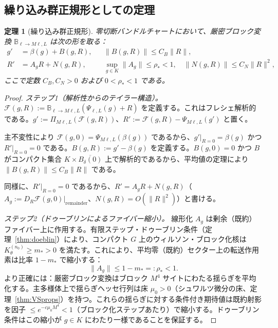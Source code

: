 \documentclass[12pt]{article}
\theoremstyle{plain}
\newtheorem{theorem}{定理}[section]
\theoremstyle{definition}
\numberwithin{equation}{section}
\begin{document}
\subsection{繰り込み群正規形としての定理}

\begin{theorem}[繰り込み群正規形]\label{thm:normalform}
零切断バンドルチャートにおいて、厳密ブロック変換 $\mathbb{B}_{\ell\to M\ell,L}$ は次の形を取る：
\begin{align}
g' &= \beta(g)+B(g,R), && \|B(g,R)\|\leq C_B\|R\|,\\
R' &= A_g R+N(g,R), && \sup_{g\in K}\|A_g\|\leq\rho_*<1,\quad \|N(g,R)\|\leq C_N\|R\|^2,
\end{align}
ここで定数 $C_B,C_N>0$ および $0<\rho_*<1$ である。
\end{theorem}

\begin{proof}
\emph{ステップ1（解析性からのテイラー構造）。}
$\mathcal{F}(g,R):=\mathbb{B}_{\ell\to M\ell,L}(\Psi_{\ell,L}(g)+R)$ を定義する。これはフレシェ解析的である。$g':=\Pi_{M\ell,L}(\mathcal{F}(g,R))$、$R':=\mathcal{F}(g,R)-\Psi_{M\ell,L}(g')$ と置く。

主不変性により $\mathcal{F}(g,0)=\Psi_{M\ell,L}(\beta(g))$ であるから、$g'|_{R=0}=\beta(g)$ かつ $R'|_{R=0}=0$ である。$B(g,R):=g'-\beta(g)$ を定義する。$B(g,0)=0$ かつ $B$ がコンパクト集合 $K\times\overline{B_\delta(0)}$ 上で解析的であるから、平均値の定理により $\|B(g,R)\|\leq C_B\|R\|$ である。

同様に、$R'|_{R=0}=0$ であるから、$R'=A_g R+N(g,R)$（$A_g:=D_R\mathcal{F}(g,0)|_{\mathrm{remainder}}$、$N(g,R)=O(\|R\|^2)$）と書ける。

\emph{ステップ2（ドゥーブリンによるファイバー縮小）。}
線形化 $A_g$ は剰余（既約）ファイバー上に作用する。有限ステップ・ドゥーブリン条件（定理~\ref{thm:doeblin}）により、コンパクト $G$ 上のウィルソン・ブロック化核は $K_\theta^{(n_0)}\geq m_*>0$ を満たす。これにより、平均零（既約）セクター上の転送作用素は比率 $1-m_*$ で縮小する：
\begin{equation}
\|A_g\| \leq 1-m_* =: \rho_* < 1.
\end{equation}
より正確には：厳密ブロック変換はブロック $M^4$ サイトにわたる揺らぎを平均化する。主多様体上で揺らぎヘッセ行列は床 $\mu_0>0$（シュワルツ微分の床、定理~\ref{thm:VSprops}）を持つ。これらの揺らぎに対する条件付き期待値は既約射影を因子 $\leq e^{-c\mu_0 M^4}<1$（ブロック化ステップあたり）で縮小する。ドゥーブリン条件はこの縮小が $g\in K$ にわたり一様であることを保証する。
\end{proof}
\end{document}
